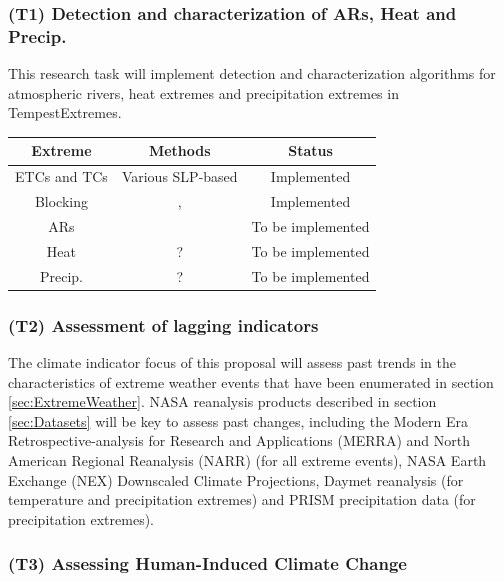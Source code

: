 \documentclass[11pt]{article}
\begin{document}

\subsubsection{(T1) Detection and characterization of ARs, Heat and Precip.}

This research task will implement detection and characterization algorithms for atmospheric rivers, heat extremes and precipitation extremes in TempestExtremes.

\begin{tabular}{ccc}
\hline Extreme & Methods & Status \\
\hline ETCs and TCs & Various SLP-based & {\color{green} Implemented} \\
Blocking & \cite{scherrer2006two}, \cite{pelly2003new} & {\color{green} Implemented} \\
ARs & \cite{neiman2008meteorological} & {\color{red} To be implemented} \\
Heat & ? & {\color{red} To be implemented} \\
Precip. & ? & {\color{red} To be implemented} \\
\hline
\end{tabular}

\subsubsection{(T2) Assessment of lagging indicators}

The climate indicator focus of this proposal will assess past trends in the characteristics of extreme weather events that have been enumerated in section \ref{sec:ExtremeWeather}.  NASA reanalysis products described in section \ref{sec:Datasets} will be key to assess past changes, including the Modern Era Retrospective-analysis for Research and Applications (MERRA) and North American Regional Reanalysis (NARR) (for all extreme events), NASA Earth Exchange (NEX) Downscaled Climate Projections, Daymet reanalysis (for temperature and precipitation extremes) and PRISM precipitation data (for precipitation extremes).

\subsubsection{(T3) Assessing Human-Induced Climate Change}
\end{document}
